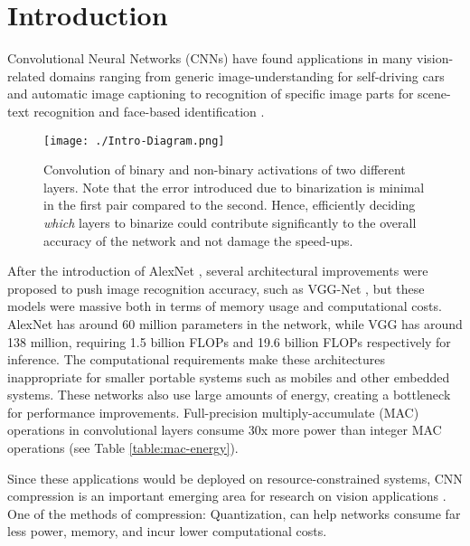 \documentclass[10pt,twocolumn,letterpaper]{article}
\begin{document}
\vspace{-0.25cm}
\section{Introduction}

\noindent Convolutional Neural Networks (CNNs) have found applications in many vision-related domains ranging from generic image-understanding for self-driving cars \cite{bojarski2016end} and automatic image captioning \cite{you2016image,johnson2016densecap} to recognition of specific image parts for scene-text recognition \cite{mishra2012top,neumann2012real} and face-based identification \cite{taigman2014deepface}.
\begin{figure}[t]
\centering
\texttt{[image: ./Intro-Diagram.png]}
\caption{Convolution of binary and non-binary activations of two different layers. Note that the error introduced due to binarization is minimal in the first pair compared to the second. Hence, efficiently deciding \textit{which} layers to binarize could contribute significantly to the overall accuracy of the network and not damage the speed-ups.}
\label{fig:introdiag}
\vspace{-0.5cm}
\end{figure}

After the introduction of AlexNet \cite{alex2012alexnet}, several architectural improvements were proposed to push image recognition accuracy, such as VGG-Net \cite{simonyan2014very}, but these models were massive both in terms of memory usage and computational costs. AlexNet has around 60 million parameters in the network, while VGG has around 138 million, requiring 1.5 billion FLOPs and 19.6 billion FLOPs respectively for inference. The computational requirements make these architectures inappropriate for smaller portable systems such as mobiles and other embedded systems. These networks also use large amounts of energy, creating a bottleneck for performance improvements. Full-precision multiply-accumulate (MAC) operations in convolutional layers consume 30x more power than integer MAC operations (see Table \ref{table:mac-energy}). 

Since these applications would be deployed on resource-constrained systems, CNN compression is an important emerging area for research on vision applications \cite{hubara2016quantized,zhou2016dorefa, han2015deep, liu2017learning, moczulski2015acdc, yang2015deep, he2016deep, iandola2016squeezenet}. One of the methods of compression: Quantization, can help networks consume far less power, memory, and incur lower computational costs.
\end{document}
